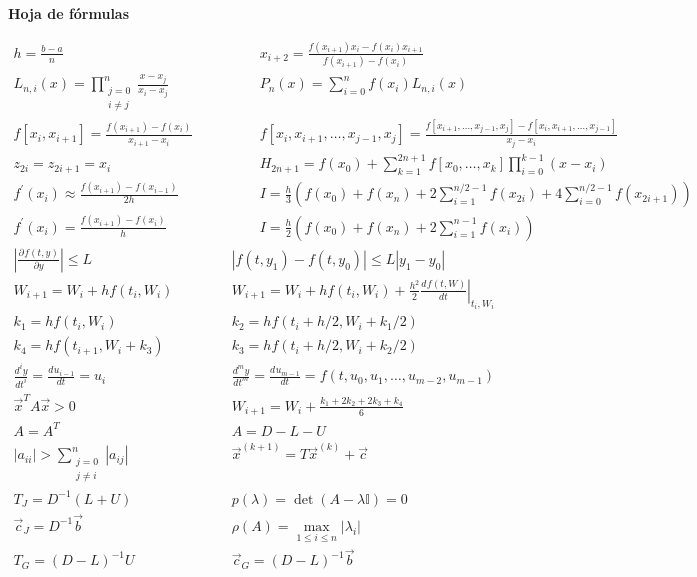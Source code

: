 \documentclass[12pt]{article}
\newcommand{\I}{\ensuremath{\mathbb{I}}}
\newcommand{\diff}[3]{\frac{d^{#3} #1}{d#2^{#3}}}
\newcommand{\pdiff}[3]{\frac{\partial^{#3} #1}{\partial #2^{#3}}}
\newcommand{\abs}[1]{\left| #1 \right|}
\begin{document}
\clearpage
\begin{center}
\textbf{Hoja de fórmulas}
\end{center}
{\large
\[
\begin{array}{cc}
h = \frac{b - a}{n} \qquad & \qquad
x_{i+2} = \frac{f(x_{i+1}){x_i}-f(x_{i}){x_{i+1}}}{f(x_{i+1}) - f(x_i)} \\
L_{n, i}(x) = \prod\limits_{\substack{j=0\\ i \neq j}}^n \frac{x - x_j}{x_i - x_j} \qquad & \qquad
P_n(x) = \sum\limits_{i = 0}^n f(x_i)L_{n,i}(x) \\
f\left[x_i, x_{i+1}\right] = \frac{f(x_{i+1})-f(x_i)}{x_{i+1}-x_i} \qquad & \qquad
f\left[ x_i, x_{i+1}, \ldots, x_{j-1}, x_j\right] = \frac{f\left[x_{i+1}, \ldots, x_{j-1}, x_j\right] - f\left[ x_i, x_{i+1}, \ldots, x_{j-1} \right]}{x_j - x_i} \\
z_{2i} = z_{2i+1} = x_i \qquad & \qquad
H_{2n+1} = f(x_0) + \sum\limits_{k=1}^{2n+1} f\left[x_0, \ldots, x_k\right] \prod\limits_{i = 0}^{k-1}(x-x_i)  \\
f^\prime(x_i) \approx \frac{f(x_{i+1}) - f(x_{i-1})}{2h} \qquad & \qquad
I = \frac{h}{3}\left( f(x_0) + f(x_n) + 2\sum\limits_{i=1}^{n/2-1}f(x_{2i}) + 4\sum\limits_{i=0}^{n/2-1}f(x_{2i+1}) \right) \\
f^\prime(x_i) = \frac{f(x_{i+1})-f(x_i)}{h} \qquad & \qquad
I = \frac{h}{2}\left( f(x_0) + f(x_n) + 2\sum\limits_{i = 1}^{n-1}f(x_i)\right) \\
\abs{\pdiff{f(t,y)}{y}{}} \leq L & \abs{f(t, y_1) -f(t, y_0)} \leq L\abs{y_1 - y_0}\\
W_{i+1} = W_i + h f(t_i,W_i) & W_{i+1} = W_i + h f(t_i,W_i) + \frac{h^2}{2} \left.\diff{f(t,W)}{t}{} \right|_{t_i, W_i} \\
k_1  =  h f(t_i,W_i) & k_2  =  h f(t_i+h/2,W_i + k_1/2) \\
k_4  =  h f(t_{i+1},W_i + k_3) & k_3  =  h f(t_i+h/2,W_i + k_2/2)\\
\diff{y}{t}{i} = \diff{u_{i-1}}{t}{} = u_i & \diff{y}{t}{m} = \diff{u_{m-1}}{t}{} = f(t, u_0, u_1, \ldots, u_{m-2}, u_{m-1})\\
\vec{x}^TA\vec{x} > 0 & W_{i+1} = W_i + \frac{k_1+2k_2+2k_3+k_4}{6}\\
A = A^T & A = D - L - U\\
|a_{ii}| > \sum\limits_{\substack{j=0\\j\neq i}}^n |a_{ij}| & \vec{x}^{(k+1)} = T\vec{x}^{(k)} + \vec{c}\\
T_J = D^{-1}(L+U) & p(\lambda) = \det(A-\lambda \I) = 0\\
\vec{c}_J = D^{-1}\vec{b} & \rho(A) = \max\limits_{1\leq i\leq n}|\lambda_i|\\
T_G = (D-L)^{-1}U & \vec{c}_G = (D-L)^{-1}\vec{b}
\end{array}
\]
}
\end{document}
